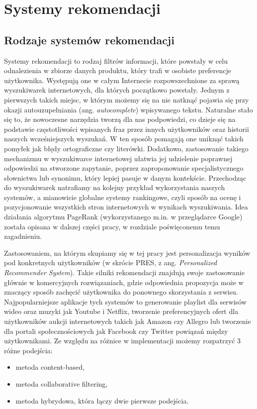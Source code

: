 \chapter{Systemy rekomendacji}
\thispagestyle{chapterBeginStyle}

\section{Rodzaje systemów rekomendacji}

Systemy rekomendacji to rodzaj filtrów informacji, które powstały w celu odnalezienia w zbiorze danych produktu, który trafi w osobiste preferencje użytkownika. Występują one w całym Internecie rozpowszechnione za sprawą wyszukiwarek internetowych, dla których początkowo powstały. Jednym z pierwszych takich miejsc, w którym możemy się na nie natknąć pojawia się przy okazji autouzupełniania (ang. \textit{autocomplete}) wpisywanego tekstu. Naturalne stało się to, że nowoczesne narzędzia tworzą dla nas podpowiedzi, co dzieje się na podstawie częstotliwości wpisanych fraz przez innych użytkowników oraz historii naszych wcześniejszych wyszukań. W ten sposób pomagają one uniknąć takich pomyłek jak błędy ortograficzne czy literówki. Dodatkowo, zastosowanie takiego mechanizmu w wyszukiwarce internetowej ułatwia jej udzielenie poprawnej odpowiedzi na stworzone zapytanie, poprzez zaproponowanie specjalistycznego słownictwa lub synonimu, który lepiej pasuje w danym kontekście. Przechodząc do wyszukiwarek natrafiamy na kolejny przykład wykorzystania naszych systemów, a mianowicie globalne systemy rankingowe, czyli sposób na ocenę i pozycjonowanie wszystkich stron internetowych w wynikach wyszukiwania. Idea działania algorytmu PageRank (wykorzystanego m.in. w przeglądarce Google) została opisana w dalszej części pracy, w rozdziale poświęconemu temu zagadnieniu.

Zastosowaniem, na którym skupiamy się w tej pracy jest personalizacja wyników pod konkretnych użytkowników (w skrócie PRES, z ang. \textit{Personalized Recommender System}). Takie silniki rekomendacji znajdują swoje zastosowanie głównie w komercyjnych rozwiązaniach, gdzie odpowiednia propozycja może w znaczący sposób zachęcić użytkownika do ponownego skorzystania z serwisu. Najpopularniejsze aplikacje tych systemów to generowanie playlist dla serwisów wideo oraz muzyki jak Youtube i Netflix, tworzenie preferencyjnych ofert dla użytkowników aukcji internetowych takich jak Amazon czy Allegro lub tworzenie dla portali społecznościowych jak Facebook czy Twitter powiązań między użytkownikami. Ze względu na różnice w implementacji możemy rozpatrzyć 3 różne podejścia:
\begin{itemize}
    \item metoda content-based,
    \item metoda collaborative filtering,
    \item metoda hybrydowa, która łączy dwie pierwsze podejścia.
\end{itemize}


